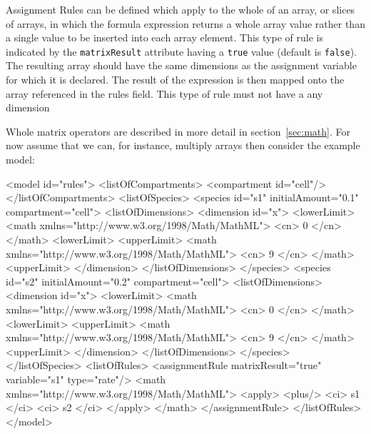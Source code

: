 \documentclass{cekarticle}
\begin{document}
Assignment Rules can be defined which apply to the whole of an array, or
slices of arrays, in which the formula expression returns a whole
array value rather than a single value to be inserted into each
array element.  This type of rule is indicated by the \texttt{matrixResult}
attribute having a \texttt{true} value (default is \texttt{false}).
The resulting array should have the same dimensions as the assignment variable
for which it is declared.  The result of the expression is then mapped onto
the array referenced in the rules  field.
This type of rule must not have a any dimension

Whole matrix operators are described in
more detail in section~\ref{sec:math}.  For now assume that we
can, for instance, multiply arrays then consider the example
model:

\begin{example}
<model id="rules">
    <listOfCompartments>
        <compartment id="cell"/>
    </listOfCompartments>
    <listOfSpecies>
        <species id="s1" initialAmount="0.1" compartment="cell">
            <listOfDimensions>
                <dimension id="x">
                    <lowerLimit>
                        <math xmlns="http://www.w3.org/1998/Math/MathML">
                            <cn> 0 </cn>
                        </math>
                    <lowerLimit>
                    <upperLimit>
                        <math xmlns="http://www.w3.org/1998/Math/MathML">
                            <cn> 9 </cn>
                        </math>
                    <upperLimit>
                </dimension>
            </listOfDimensions>
        </species>
        <species id="s2" initialAmount="0.2" compartment="cell">
            <listOfDimensions>
                <dimension id="x">
                    <lowerLimit>
                        <math xmlns="http://www.w3.org/1998/Math/MathML">
                            <cn> 0 </cn>
                        </math>
                    <lowerLimit>
                    <upperLimit>
                        <math xmlns="http://www.w3.org/1998/Math/MathML">
                            <cn> 9 </cn>
                        </math>
                    <upperLimit>
                </dimension>
            </listOfDimensions>
        </species>
    </listOfSpecies>
    <listOfRules>
        <assignmentRule matrixResult="true" variable="s1" type="rate"/>
            <math xmlns="http://www.w3.org/1998/Math/MathML">
                <apply>
                    <plus/>
                    <ci> s1 </ci>
                    <ci> s2 </ci>
                </apply>
            </math>
        </assignmentRule>
    </listOfRules>
</model>
\end{example}
\end{document}
